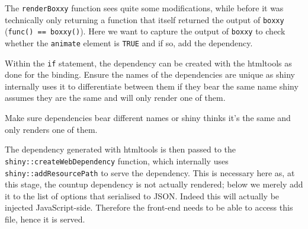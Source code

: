 \documentclass[10pt,]{krantz}
\makeatletter
\newenvironment{Shaded}{\begin{snugshade}}{\end{snugshade}}
\newcommand{\CommentTok}[1]{\textcolor[rgb]{0.37,0.37,0.37}{\textit{#1}}}
\newcommand{\ControlFlowTok}[1]{\textcolor[rgb]{0.27,0.27,0.27}{\textbf{#1}}}
\newcommand{\DataTypeTok}[1]{\textcolor[rgb]{0.27,0.27,0.27}{#1}}
\newcommand{\KeywordTok}[1]{\textcolor[rgb]{0.27,0.27,0.27}{\textbf{#1}}}
\newcommand{\NormalTok}[1]{#1}
\newcommand{\OperatorTok}[1]{\textcolor[rgb]{0.43,0.43,0.43}{\textbf{#1}}}
\newcommand{\OtherTok}[1]{\textcolor[rgb]{0.37,0.37,0.37}{#1}}
\newcommand{\StringTok}[1]{\textcolor[rgb]{0.5,0.5,0.5}{#1}}
\newenvironment{kframe}{%
\medskip{}
\setlength{\fboxsep}{.8em}
 \def\at@end@of@kframe{}%
 \ifinner\ifhmode%
  \def\at@end@of@kframe{\end{minipage}}%
  \begin{minipage}{\columnwidth}%
 \fi\fi%
 \def\FrameCommand##1{\hskip\@totalleftmargin \hskip-\fboxsep
 \colorbox{shadecolor}{##1}\hskip-\fboxsep
     \hskip-\linewidth \hskip-\@totalleftmargin \hskip\columnwidth}%
 \MakeFramed {\advance\hsize-\width
   \@totalleftmargin\z@ \linewidth\hsize
   \@setminipage}}%
 {\par\unskip\endMakeFramed%
 \at@end@of@kframe}
\renewenvironment{Shaded}{\begin{kframe}}{\end{kframe}}
\newenvironment{rmdblock}[1]
  {
  \begin{itemize}
  \renewcommand{\labelitemi}{
    \raisebox{-.7\height}[0pt][0pt]{
      {\setkeys{Gin}{width=3em,keepaspectratio}\texttt{[image: images/\#1]}}
    }
  }
  \setlength{\fboxsep}{1em}
  \begin{kframe}
  \item
  }
  {
  \end{kframe}
  \end{itemize}
  }
\newenvironment{rmdnote}
  {\begin{rmdblock}{note}}
  {\end{rmdblock}}
\makeatother
\begin{document}
The \texttt{renderBoxxy} function sees quite some modifications, while before it was technically only returning a function that itself returned the output of \texttt{boxxy} (\texttt{func()\ ==\ boxxy()}). Here we want to capture the output of \texttt{boxxy} to check whether the \texttt{animate} element is \texttt{TRUE} and if so, add the dependency.

\begin{Shaded}
\end{Shaded}

Within the \texttt{if} statement, the dependency can be created with the htmltools as done for the binding. Ensure the names of the dependencies are unique as shiny internally uses it to differentiate between them if they bear the same name shiny assumes they are the same and will only render one of them.

\begin{rmdnote}
Make sure dependencies bear different names or shiny thinks it's the
same and only renders one of them.
\end{rmdnote}

The dependency generated with htmltools is then passed to the \texttt{shiny::createWebDependency} function, which internally uses \texttt{shiny::addResourcePath} to serve the dependency. This is necessary here as, at this stage, the countup dependency is not actually rendered; below we merely add it to the list of options that serialised to JSON. Indeed this will actually be injected JavaScript-side. Therefore the front-end needs to be able to access this file, hence it is served.
\end{document}
